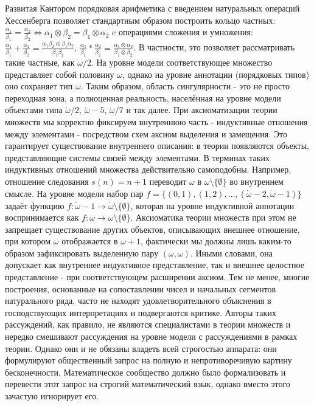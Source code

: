 \documentclass[12pt]{article}
\begin{document}
Развитая Кантором порядковая арифметика с введением натуральных операций Хессенберга позволяет стандартным образом построить кольцо частных: $\frac{\alpha_1}{\beta_1} = \frac{\alpha_2}{\beta_2} \Leftrightarrow \alpha_1\otimes\beta_2 = \beta_1\otimes\alpha_2$ c операциями сложения и умножения: $\frac{\alpha_1}{\beta_1} + \frac{\alpha_2}{\beta_2} = \frac{\alpha_1\beta_2 \oplus \beta_1\alpha_2}{\beta_1\beta_2}$, $\frac{\alpha_1}{\beta_1} * \frac{\alpha_2}{\beta_2} = \frac{\alpha_1\otimes\alpha_2}{\beta_1\otimes\beta_2}$. В частности, это позволяет рассматривать такие частные, как $\omega/2$. На уровне модели соответствующее множество представляет собой половину $\omega$, однако на уровне аннотации (порядковых типов) оно сохраняет тип $\omega$. Таким образом, область сингулярности - это не просто переходная зона, а полноценная реальность, населённая на уровне модели объектами типа $\dot{\omega}/2$, $\dot{\omega} - 5$, $\dot{\omega}/7$ и так далее. При аксиоматизации теории множеств мы корректно фиксируем внутреннюю часть - индуктивные отношения между элементами - посредством схем аксиом выделения и замещения. Это гарантирует существование внутреннего описания: в теории появляются объекты, представляющие системы связей между элементами. В терминах таких индуктивных отношений множества действительно самоподобны. Например, отношение следования $s(n) = n + 1$ переводит $\omega$ в $\omega \setminus \{\emptyset\}$ во внутреннем смысле. На уровне модели набор пар $f = \{(0, 1), (1 ,2), \dots, (\dot{\omega} - 2, \dot{\omega} - 1) \}$ задаёт функцию $f : \dot{\omega} - 1 \to \dot{\omega} \setminus \{\emptyset\}$, которая на уровне индуктивной аннотации воспринимается как $f : \omega \to \omega \setminus \{\emptyset\}$. Аксиоматика теории множеств при этом не запрещает существование других объектов, описывающих внешнее отношение, при котором $\omega$ отображается в $\omega + 1$, фактически мы должны лишь каким-то образом зафиксировать выделенную пару $(\omega, \omega)$. Иными словами, она допускает как внутреннее индуктивное представление, так и внешнее целостное представление - при соответствующем расширении аксиом. Тем не менее, многие построения, основанные на сопоставлении чисел и начальных сегментов натурального ряда, часто не находят удовлетворительного объяснения в господствующих интерпретациях и подвергаются критике. Авторы таких рассуждений, как правило, не являются специалистами в теории множеств и нередко смешивают рассуждения на уровне модели с рассуждениями в рамках теории. Однако они и не обязаны владеть всей строгостью аппарата: они формулируют общественный запрос на полную и непротиворечивую картину бесконечности. Математическое сообщество должно было формализовать и перевести этот запрос на строгий математический язык, однако вместо этого зачастую игнорирует его.
\end{document}
